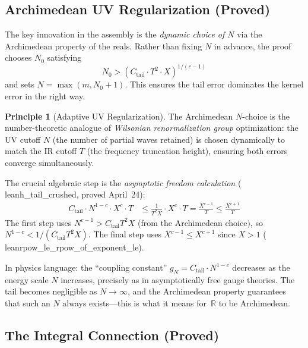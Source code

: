 \documentclass[11pt,a4paper]{article}
\theoremstyle{definition}
\newtheorem{principle}[definition]{Principle}
\newcommand{\RR}{\mathbb{R}}
\newcommand{\lean}[1]{\texttt{#1}}
\begin{document}
\subsection{Archimedean UV Regularization (Proved)}

The key innovation in the assembly is the \emph{dynamic choice of $N$}
via the Archimedean property of the reals. Rather than fixing $N$ in
advance, the proof chooses $N_0$ satisfying
\[
  N_0 > (C_{\mathrm{tail}} \cdot T^2 \cdot X)^{1/(c-1)}
\]
and sets $N = \max(m, N_0 + 1)$. This ensures the tail error dominates
the kernel error in the right way.

\begin{principle}[Adaptive UV Regularization]
The Archimedean $N$-choice is the number-theoretic analogue of
\emph{Wilsonian renormalization group} optimization: the UV cutoff $N$
(the number of partial waves retained) is chosen dynamically to match
the IR cutoff $T$ (the frequency truncation height), ensuring both
errors converge simultaneously.

The crucial algebraic step is the \emph{asymptotic freedom calculation}
(\\lean{h\_tail\_crushed}, proved April~24):
\begin{align}
  C_{\mathrm{tail}} \cdot N^{1-c} \cdot X^c \cdot T
  &\leq \frac{1}{T^2 X} \cdot X^c \cdot T
  = \frac{X^{c-1}}{T}
  \leq \frac{X^{c+1}}{T}
\end{align}
The first step uses $N^{c-1} > C_{\mathrm{tail}} T^2 X$ (from the
Archimedean choice$)$, so $N^{1-c} < 1/(C_{\mathrm{tail}} T^2 X)$.
The final step uses $X^{c-1} \leq X^{c+1}$ since $X > 1$
(\\lean{rpow\_le\_rpow\_of\_exponent\_le}).

In physics language: the ``coupling constant'' $g_N = C_{\mathrm{tail}} \cdot N^{1-c}$
decreases as the energy scale $N$ increases, precisely as in
asymptotically free gauge theories. The tail becomes negligible as
$N \to \infty$, and the Archimedean property guarantees that such an
$N$ always exists---this is what it means for~$\RR$ to be Archimedean.
\end{principle}

\subsection{The Integral Connection (Proved)}
\end{document}
